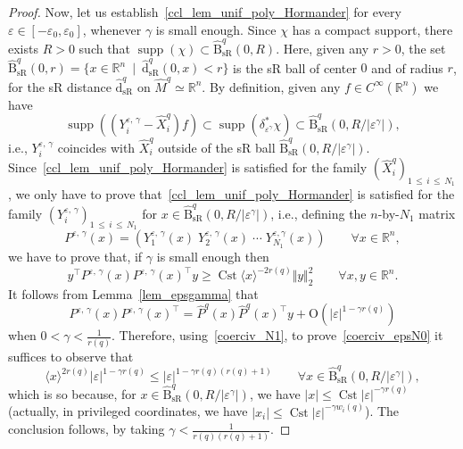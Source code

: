 \documentclass[AHL,Unicode,published]{cedram}
\newcommand*\R{\mathbb{R}}
\newcommand{\rmO}{\mathrm{O}}
\DeclareMathOperator{\supp}{supp}
\DeclareMathOperator{\Cst}{Cst}
\newcommand{\hatdsR}{\widehat{\mathrm{d}}_{\mathrm{sR}}}
\newcommand{\hatBsR}{\widehat{\mathrm{B}}_{\mathrm{sR}}}
\renewcommand{\geq}{\geqslant}
\renewcommand{\leq}{\leqslant}
\let\oldforall\forall
\renewcommand*{\forall}{\mathrel{\oldforall}}
\begin{document}
\begin{proof}
Now, let us establish~\eqref{ccl_lem_unif_poly_Hormander} for every $\varepsilon\in[-\varepsilon_0,\varepsilon_0]$, whenever $\gamma$ is small enough. Since $\chi$ has a compact support, there exists $R>0$ such that $\supp(\chi)\subset\hatBsR^{q}(0,R)$. Here, given any $r>0$, the set $\hatBsR^{q}(0,r) = \{x\in\R^n\ \mid\ \hatdsR^{q}(0,x)<r\}$ is the sR ball of center $0$ and of radius $r$, for the sR distance $\hatdsR^{q}$ on $\widehat M^{q}\simeq\R^n$. By definition, given any $f\in C^\infty(\R^n)$ we have
\[
\supp\left(\left(Y^{\varepsilon,\,\gamma}_i -\widehat X_i^{q}\right)f \right) \subset \supp\left(\delta_{\varepsilon^\gamma}^*\chi\right) \subset \hatBsR^{q}(0,R/\vert\varepsilon^\gamma\vert),
\]
i.e., $Y^{\varepsilon,\,\gamma}_i$ coincides with $\widehat X_i^{q}$ outside of the sR ball $\hatBsR^{q}(0,R/\vert\varepsilon^\gamma\vert)$. Since~\eqref{ccl_lem_unif_poly_Hormander} is satisfied for the family $(\widehat X_i^{q})_{1\,\leq\,i\,\leq\,N_1}$, we only have to prove that~\eqref{ccl_lem_unif_poly_Hormander} is satisfied for the family $(Y^{\varepsilon,\,\gamma}_i)_{1\,\leq\,i\,\leq\,N_1}$ for $x\in\hatBsR^{q}(0,R/\vert\varepsilon^\gamma\vert)$, i.e., defining the $n$-by-$N_1$ matrix
\[
P^{\varepsilon,\,\gamma}(x) =
\left(Y_1^{\varepsilon,\,\gamma}(x)\;  Y_2^{\varepsilon,\,\gamma}(x) \; \cdots \; Y_{N_1}^{\varepsilon,\gamma}(x)\right)
\qquad\forall x\in\R^n,
\]
we have to prove that, if $\gamma$ is small enough then
\begin{equation}\label{coerciv_epsN0}
y^\top P^{\varepsilon,\,\gamma}(x) P^{\varepsilon,\,\gamma}(x)^\top y \geq \Cst \langle x\rangle^{-2r(q)} \Vert y\Vert_2^2\qquad \forall x,y\in\R^n.
\end{equation}
It follows from Lemma~\ref{lem_epsgamma} that
\[
P^{\varepsilon,\,\gamma}(x) P^{\varepsilon,\,\gamma}(x)^\top = \widehat{P}^{q}(x) \widehat{P}^{q}(x)^\top y + \rmO\left(\vert\varepsilon\vert^{1-\gamma r(q)}\right)
\]
when $0<\gamma<\frac{1}{r(q)}$. Therefore, using~\eqref{coerciv_N1}, to prove~\eqref{coerciv_epsN0} it suffices to observe that
\[
\langle x\rangle^{2r(q)}\vert\varepsilon\vert^{1-\gamma r(q)} \leq \vert\varepsilon\vert^{1-\gamma r(q)(r(q)+1)}
\qquad\forall x\in\hatBsR^{q}(0,R/\vert\varepsilon^\gamma\vert),
\]
which is so because, for $x\in\hatBsR^{q}(0,R/\vert\varepsilon^\gamma\vert)$, we have $\vert x\vert\leq \Cst \vert\varepsilon\vert^{-\gamma r(q)}$ (actually, in privileged coordinates, we have $\vert x_i\vert\leq \Cst\vert\varepsilon\vert^{-\gamma w_i(q)}$). The conclusion follows, by taking $\gamma<\frac{1}{r(q)(r(q)+1)}$.
\end{proof}
\end{document}
